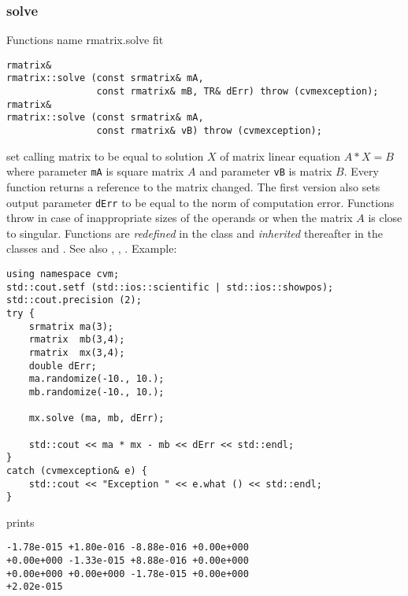 \subsubsection{solve}
Functions%
\pdfdest name {rmatrix.solve} fit
\begin{verbatim}
rmatrix&
rmatrix::solve (const srmatrix& mA,
                const rmatrix& mB, TR& dErr) throw (cvmexception);
rmatrix&
rmatrix::solve (const srmatrix& mA,
                const rmatrix& vB) throw (cvmexception);
\end{verbatim}
set  calling matrix to be equal to  solution $X$ of 
matrix linear equation
$A*X=B$ where parameter \verb"mA" is square matrix $A$
and parameter \verb"vB" is matrix $B$.
Every function returns a reference to the matrix changed.
The first version also sets  output parameter \verb"dErr" to be equal
to the norm of computation error.
Functions throw 
in case of inappropriate sizes
of the operands or when the matrix $A$ is close to singular.
Functions are \emph{redefined} in  the class
 and
\emph{inherited} thereafter in the classes
 and
.
See also
,
,
.
Example:
\begin{Verbatim}
using namespace cvm;
std::cout.setf (std::ios::scientific | std::ios::showpos);
std::cout.precision (2);
try {
    srmatrix ma(3);
    rmatrix  mb(3,4);
    rmatrix  mx(3,4);
    double dErr;
    ma.randomize(-10., 10.);
    mb.randomize(-10., 10.);

    mx.solve (ma, mb, dErr);

    std::cout << ma * mx - mb << dErr << std::endl;
}
catch (cvmexception& e) {
    std::cout << "Exception " << e.what () << std::endl;
}
\end{Verbatim}
prints
\begin{Verbatim}
-1.78e-015 +1.80e-016 -8.88e-016 +0.00e+000
+0.00e+000 -1.33e-015 +8.88e-016 +0.00e+000
+0.00e+000 +0.00e+000 -1.78e-015 +0.00e+000
+2.02e-015
\end{Verbatim}
\newpage





